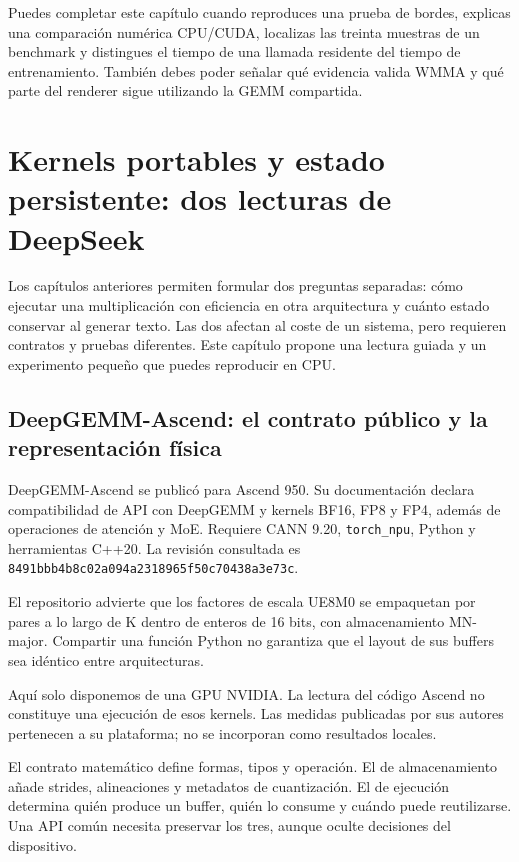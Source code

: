 \documentclass[12pt,a4paper,oneside]{report}
\begin{document}
\begin{comprueba}
Puedes completar este capítulo cuando reproduces una prueba de bordes, explicas una comparación numérica CPU/CUDA, localizas las treinta muestras de un benchmark y distingues el tiempo de una llamada residente del tiempo de entrenamiento. También debes poder señalar qué evidencia valida WMMA y qué parte del renderer sigue utilizando la GEMM compartida.

\end{comprueba}

\chapter{Kernels portables y estado persistente: dos lecturas de DeepSeek}
\label{ch:deepseek-estado}
Los capítulos anteriores permiten formular dos preguntas separadas: cómo ejecutar una multiplicación con eficiencia en otra arquitectura y cuánto estado conservar al generar texto. Las dos afectan al coste de un sistema, pero requieren contratos y pruebas diferentes. Este capítulo propone una lectura guiada y un experimento pequeño que puedes reproducir en CPU.

\section{DeepGEMM-Ascend: el contrato público y la representación física}
DeepGEMM-Ascend se publicó para Ascend 950. Su documentación declara compatibilidad de API con DeepGEMM y kernels BF16, FP8 y FP4, además de operaciones de atención y MoE. Requiere CANN 9.20, \texttt{torch\_npu}, Python y herramientas C++20. La revisión consultada es \texttt{8491bbb4b8c0\allowbreak{}2a094a231896\allowbreak{}5f50c70438a3\allowbreak{}e73c}. \cite{deepgemm-ascend}

El repositorio advierte que los factores de escala UE8M0 se empaquetan por pares a lo largo de K dentro de enteros de 16 bits, con almacenamiento MN-major. Compartir una función Python no garantiza que el layout de sus buffers sea idéntico entre arquitecturas. \cite{deepgemm-ascend}

Aquí solo disponemos de una GPU NVIDIA. La lectura del código Ascend no constituye una ejecución de esos kernels. Las medidas publicadas por sus autores pertenecen a su plataforma; no se incorporan como resultados locales.

\begin{idea}
El contrato matemático define formas, tipos y operación. El de almacenamiento añade strides, alineaciones y metadatos de cuantización. El de ejecución determina quién produce un buffer, quién lo consume y cuándo puede reutilizarse. Una API común necesita preservar los tres, aunque oculte decisiones del dispositivo.

\end{idea}
\end{document}
